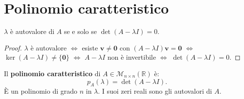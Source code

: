 \section{Polinomio caratteristico}
\label{sec:polinomio-caratteristico}

\begin{theorembox}
$\lambda$ è autovalore di $A$ se e solo se $\det(A - \lambda I) = 0$.
\end{theorembox}
\begin{proof}
$\lambda$ è autovalore $\Leftrightarrow$ esiste $\mathbf{v} \neq \mathbf{0}$ con $(A - \lambda I)\mathbf{v} = \mathbf{0}$ $\Leftrightarrow$ $\ker(A - \lambda I) \neq \{\mathbf{0}\}$ $\Leftrightarrow$ $A - \lambda I$ non è invertibile $\Leftrightarrow$ $\det(A - \lambda I) = 0$.
\end{proof}

\begin{definitionbox}
Il \textbf{polinomio caratteristico} di $A \in \mathcal{M}_{n \times n}(\mathbb{R})$ è:
\[ p_A(\lambda) = \det(A - \lambda I). \]
È un polinomio di grado $n$ in $\lambda$. I suoi zeri reali sono gli autovalori di $A$.
\end{definitionbox}

